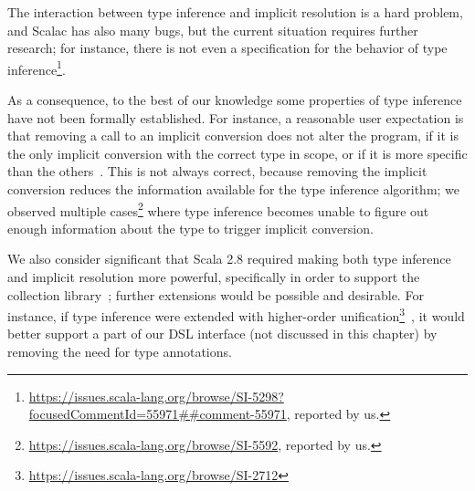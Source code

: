 The interaction between type inference and implicit resolution is a hard problem, and Scalac has also many bugs, but the current situation requires further research; for instance, there is not even a specification for the behavior of type inference\footnote{\url{https://issues.scala-lang.org/browse/SI-5298?focusedCommentId=55971##comment-55971}, reported by us.}.

As a consequence, to the best of our knowledge some properties of type inference have not been formally established.
For instance, a reasonable user expectation is that removing a call to an implicit conversion does not alter the program, if it is the only implicit conversion with the correct type in scope, or if it is more specific than the others~\citep[Ch.~21]{Odersky11book}. This is not always correct, because removing the implicit conversion reduces the information available for the type inference algorithm; we observed multiple cases\footnote{\url{https://issues.scala-lang.org/browse/SI-5592}, reported by us.} where type inference becomes unable to figure out enough information about the type to trigger implicit conversion.

We also consider significant that Scala 2.8 required making both type inference and implicit resolution more powerful, specifically in order to support the collection library~\citep[Sec.~21.7]{Moors10TCP,Odersky11book}; further extensions would be possible and desirable.
For instance, if type inference were extended with higher-order unification\footnote{\url{https://issues.scala-lang.org/browse/SI-2712}}~\citep{Pfenning88}, it would better support a part of our DSL interface (not discussed in this chapter) by removing the need for type annotations.



